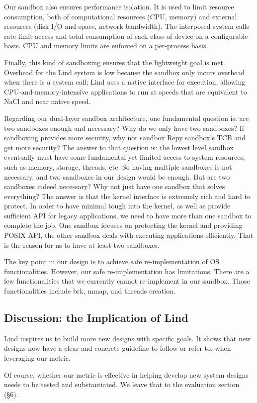 Our sandbox also ensures performance isolation. It is used to limit resource consumption, 
both of computational resources (CPU, memory) and external resources (disk I/O and space, 
network bandwidth). The interposed system calls rate limit access and total consumption of 
each class of device on a configurable basis. CPU and memory limits are enforced on 
a per-process basis. 

Finally, this kind of sandboxing ensures that the lightweight goal is met. Overhead for the Lind system 
is low because the sandbox only incurs overhead when there is a system call; Lind uses a native interface 
for execution, allowing CPU-and-memory-intensive applications to run at speeds that are equivalent 
to NaCl and near native speed. 

Regarding our dual-layer sandbox architecture, one fundamental question is: are two sandboxes 
enough and necessary? Why do we only have two sandboxes? If sandboxing provides more security, 
why not sandbox Repy sandbox's TCB and get more security? The answer to that question is: 
the lowest level sandbox eventually must have some fundamental yet limited access to system resources, 
such as memory, storage, threads, etc. So having multiple sandboxes is not necessary, and two sandboxes in 
our design would be enough. But are two sandboxes indeed necessary? Why not just have one sandbox 
that solves everything? The answer is that the kernel interface is extremely rich and hard to protect. 
In order to have minimal tough into the kernel, as well as provide sufficient API for legacy applications, 
we need to have more than one sandbox to complete the job. One sandbox focuses on protecting 
the kernel and providing POSIX API, the other sandbox deals with executing applications efficiently. 
That is the reason for us to have at least two sandboxes.  

The key point in our design is to achieve safe re-implementation of OS functionalities. 
However, our safe re-implementation has limitations. There are a few functionalities that 
we currently cannot re-implement in our sandbox. Those functionalities include brk, mmap, and threads creation.

\subsection{Discussion: the Implication of Lind}
Lind inspires us to build more new designs with specific goals. It shows that new designs now have a clear and 
concrete guideline to follow or refer to, when leveraging our metric. 

Of course, whether our metric is effective in helping develop new system designs needs to be tested 
and substantiated. We leave that to the evaluation section (\S 6).